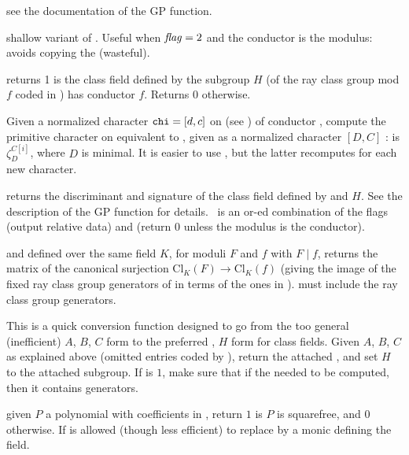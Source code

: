  see the documentation of
the GP function.

 shallow
variant of . Useful when $\hbox{\it f\kern0pt lag\/}=2$ and the conductor
is the  modulus: avoids copying the  (wasteful).

 returns 1 is the class field
defined by the subgroup $H$ (of the ray class group mod $f$ coded in )
has conductor $f$. Returns 0 otherwise.

Given a normalized character ${\tt chi} = [d,c]$ on  (see
) of conductor ,  compute the primitive
character  on  equivalent to , given as a
normalized character $[D,C]$ :  is $\zeta_D^{C[i]}$,
where $D$ is minimal. It is easier to use ,
but the latter recomputes  for each new character.

 returns the discriminant and
signature of the class field defined by  and $H$. See the description
of the GP function for details. \fl\ is an or-ed combination of the flags
 (output relative data) and  (return 0 unless the
modulus is the conductor).

  and 
defined over the same field $K$, for moduli $F$ and $f$ with
$F\mid f$, returns the matrix of the canonical surjection
$\text{Cl}_K(F)\to \text{Cl}_K(f)$ (giving the image of the fixed ray class
group generators of  in terms of the ones in ).
 must include the ray class group generators.

 This is a
quick conversion function designed to go from the too general (inefficient)
$A$, $B$, $C$ form to the preferred , $H$ form for class fields.
Given $A$, $B$, $C$ as explained above (omitted entries coded by ),
return the attached , and set $H$ to the attached subgroup. If
 is $1$, make sure that if the  needed to be computed,
then it contains generators.


 given $P$ a polynomial with
coefficients in , return $1$ is $P$ is squarefree, and $0$
otherwise. If is allowed (though less efficient) to replace 
by a monic  defining the field.


